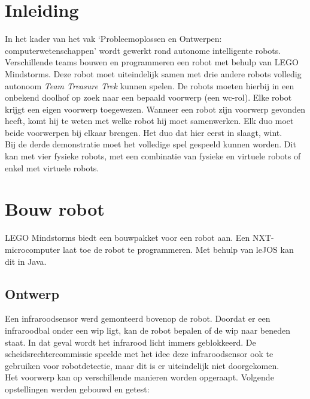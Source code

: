 \documentclass[tt3]{penoverslag}
\begin{document}
\newpage


\section{Inleiding} %
\label{ssec:Inl}
In het kader van het vak `Probleemoplossen en Ontwerpen: computerwetenschappen' wordt gewerkt rond autonome intelligente robots. Verschillende teams bouwen en programmeren een robot met behulp van LEGO Mindstorms. Deze robot moet uiteindelijk samen met drie andere robots volledig autonoom \textit{Team Treasure Trek} kunnen spelen.
De robots moeten hierbij in een onbekend doolhof op zoek naar een bepaald voorwerp (een wc-rol). Elke robot krijgt een eigen voorwerp toegewezen. Wanneer een robot zijn voorwerp gevonden heeft, komt hij te weten met welke robot hij moet samenwerken. Elk duo moet beide voorwerpen bij elkaar brengen. Het duo dat hier eerst in slaagt, wint.\\

Bij de derde demonstratie moet het volledige spel gespeeld kunnen worden. Dit kan met vier fysieke robots, met een combinatie van fysieke en virtuele robots of enkel met virtuele robots.

\section{Bouw robot}
\label{ssec:Bouw}
LEGO Mindstorms biedt een bouwpakket voor een robot aan. Een NXT-microcomputer laat toe de robot te programmeren. Met behulp van leJOS kan dit in Java.

\subsection{Ontwerp}
\label{ssec:FysB}
Een infraroodsensor werd gemonteerd bovenop de robot. Doordat er een infraroodbal onder een wip ligt, kan de robot bepalen of de wip naar beneden staat. In dat geval wordt het infrarood licht immers geblokkeerd. De scheidsrechtercommissie speelde met het idee deze infraroodsensor ook te gebruiken voor robotdetectie, maar dit is er uiteindelijk niet doorgekomen.\\

Het voorwerp kan op verschillende manieren worden opgeraapt. Volgende opstellingen werden gebouwd en getest:
\end{document}
